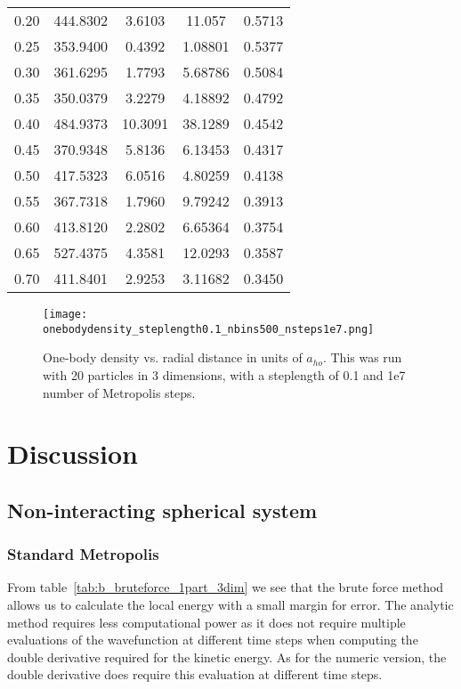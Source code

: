 \documentclass[
    a4paper, aps, twocolumn, floatfix, superscriptaddress,
    nofootinbib]{revtex4-1}
\begin{document}
\begin{table}[H]
{\begin{ruledtabular}
\begin{tabular}{ccccc}
0.20     & 444.8302 & 3.6103   & 11.057     & 0.5713      \\
0.25     & 353.9400 & 0.4392   & 1.08801    & 0.5377      \\
0.30     & 361.6295 & 1.7793   & 5.68786    & 0.5084      \\
0.35     & 350.0379 & 3.2279   & 4.18892    & 0.4792      \\
0.40     & 484.9373 & 10.3091  & 38.1289    & 0.4542      \\
0.45     & 370.9348 & 5.8136   & 6.13453    & 0.4317      \\
0.50     & 417.5323 & 6.0516   & 4.80259    & 0.4138      \\
0.55     & 367.7318 & 1.7960   & 9.79242    & 0.3913      \\
0.60     & 413.8120 & 2.2802   & 6.65364    & 0.3754      \\
0.65     & 527.4375 & 4.3581   & 12.0293    & 0.3587      \\
0.70     & 411.8401 & 2.9253   & 3.11682    & 0.3450     \\
\end{tabular}
\end{ruledtabular}
}
\end{table}

\begin{figure}[H]
    \centering
    \texttt{[image: onebodydensity\_steplength0.1\_nbins500\_nsteps1e7.png]}
    \caption{One-body density vs. radial distance in units of $a_{ho}$. This was run with 20 particles in 3 dimensions, with a steplength of 0.1 and 1e7 number of Metropolis steps.}
    \label{fig:g_onebody_density}
\end{figure}




\section{Discussion}
\subsection{Non-interacting spherical system}
\subsubsection{Standard Metropolis}
From table~\ref{tab:b_bruteforce_1part_3dim} we see that the brute force method allows us to calculate the local energy with a small margin for error. The analytic method requires less computational power as it does not require multiple evaluations of the wavefunction at different time steps when computing the double derivative required for the kinetic energy. As for the numeric version, the double derivative does require this evaluation at different time steps.
\end{document}
